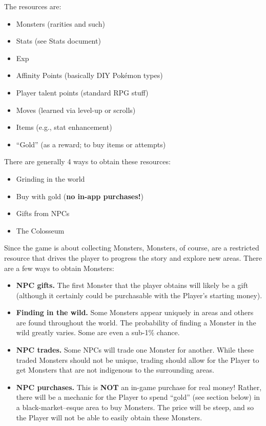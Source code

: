 

\begin{tldr}
	The resources are:
	\begin{itemize}
		\item{Monsters (rarities and such)}
		\item{Stats (see Stats document)}
		\item{Exp}
		\item{Affinity Points (basically DIY Pok\'{e}mon types)}
		\item{Player talent points (standard RPG stuff)}
		\item{Moves (learned via level-up or scrolls)}
		\item{Items (e.g., stat enhancement)}
		\item{``Gold'' (as a reward; to buy items or attempts)}
	\end{itemize}
	
	There are generally 4 ways to obtain these resources:
	\begin{itemize}
		\item{Grinding in the world}
		\item{Buy with gold (\textbf{no in-app purchases!})}
		\item{Gifts from NPCs}
		\item{The Colosseum}
	\end{itemize}
\end{tldr}

\localtoc

Since the game is about collecting Monsters, Monsters, of course, are a restricted resource that drives the player to progress the story and explore new areas. There are a few ways to obtain Monsters:
\begin{itemize}
	\item{\textbf{NPC gifts.} The first Monster that the player obtains will likely be a gift (although it certainly could be purchasable with the Player's starting money).}
	\item{\textbf{Finding in the wild.} Some Monsters appear uniquely in areas and others are found throughout the world. The probability of finding a Monster in the wild greatly varies. Some are even a sub-1\% chance.}
	\item{\textbf{NPC trades.} Some NPCs will trade one Monster for another. While these traded Monsters should not be unique, trading should allow for the Player to get Monsters that are not indigenous to the surrounding areas.}
	\item{\textbf{NPC purchases.} This is \textbf{NOT} an in-game purchase for real money! Rather, there will be a mechanic for the Player to spend ``gold'' (see section below) in a black-market--esque area to buy Monsters. The price will be steep, and so the Player will not be able to easily obtain these Monsters.}
\end{itemize}


